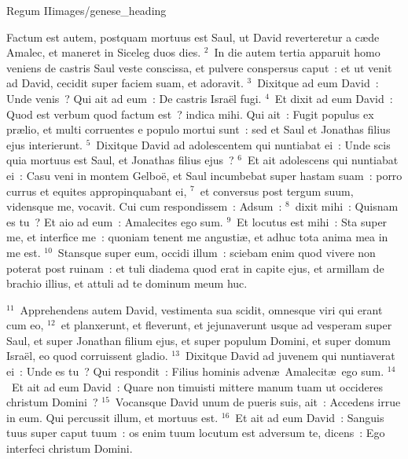 {Regum II}{images/genese_heading}


\lettrine[lines=6,image=true,loversize=0.05,lraise=-0.03]{F}{}actum est autem, postquam mortuus est Saul, ut David reverteretur a c\ae de Amalec, et maneret in Siceleg duos dies.
${}^{2}$~In die autem tertia apparuit homo veniens de castris Saul veste conscissa, et pulvere conspersus caput~: et ut venit ad David, cecidit super faciem suam, et adoravit.
${}^{3}$~Dixitque ad eum David~: Unde venis~? Qui ait ad eum~: De castris Isra\"el fugi.
${}^{4}$~Et dixit ad eum David~: Quod est verbum quod factum est~? indica mihi. Qui ait~: Fugit populus ex pr\ae lio, et multi corruentes e populo mortui sunt~: sed et Saul et Jonathas filius ejus interierunt.
${}^{5}$~Dixitque David ad adolescentem qui nuntiabat ei~: Unde scis quia mortuus est Saul, et Jonathas filius ejus~?
${}^{6}$~Et ait adolescens qui nuntiabat ei~: Casu veni in montem Gelbo\"e, et Saul incumbebat super hastam suam~: porro currus et equites appropinquabant ei,
${}^{7}$~et conversus post tergum suum, vidensque me, vocavit. Cui cum respondissem~: Adsum~:
${}^{8}$~dixit mihi~: Quisnam es tu~? Et aio ad eum~: Amalecites ego sum.
${}^{9}$~Et locutus est mihi~: Sta super me, et interfice me~: quoniam tenent me angusti\ae , et adhuc tota anima mea in me est.
${}^{10}$~Stansque super eum, occidi illum~: sciebam enim quod vivere non poterat post ruinam~: et tuli diadema quod erat in capite ejus, et armillam de brachio illius, et attuli ad te dominum meum huc.


${}^{11}$~Apprehendens autem David, vestimenta sua scidit, omnesque viri qui erant cum eo,
${}^{12}$~et planxerunt, et fleverunt, et jejunaverunt usque ad vesperam super Saul, et super Jonathan filium ejus, et super populum Domini, et super domum Isra\"el, eo quod corruissent gladio.
${}^{13}$~Dixitque David ad juvenem qui nuntiaverat ei~: Unde es tu~? Qui respondit~: Filius hominis adven\ae\ Amalecit\ae\ ego sum.
${}^{14}$~Et ait ad eum David~: Quare non timuisti mittere manum tuam ut occideres christum Domini~?
${}^{15}$~Vocansque David unum de pueris suis, ait~: Accedens irrue in eum. Qui percussit illum, et mortuus est.
${}^{16}$~Et ait ad eum David~: Sanguis tuus super caput tuum~: os enim tuum locutum est adversum te, dicens~: Ego interfeci christum Domini.


